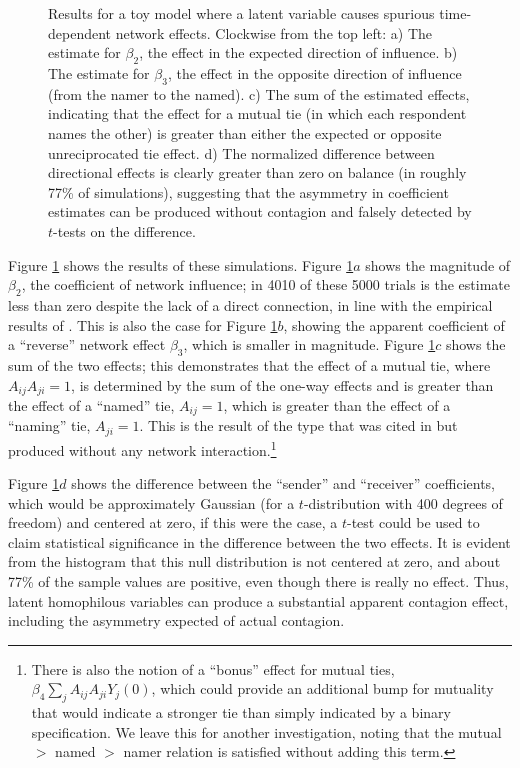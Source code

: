 \documentclass{article}
\begin{document}
\begin{multicols}{2}
\begin{figure}
\begin{center}
\end{center}
\caption{Results for a toy model where a latent variable causes spurious
  time-dependent network effects. Clockwise from the top left: a) The estimate
  for $\beta_2$, the effect in the expected direction of influence. b) The
  estimate for $\beta_3$, the effect in the opposite direction of influence
  (from the namer to the named). c) The sum of the estimated effects,
  indicating that the effect for a mutual tie (in which each respondent names
  the other) is greater than either the expected or opposite unreciprocated tie
  effect. d) The normalized difference between directional effects is clearly
  greater than zero on balance (in roughly 77\% of simulations), suggesting
  that the asymmetry in coefficient estimates can be produced without contagion
  and falsely detected by $t$-tests on the
  difference. \label{fig:timeseriesmodel}}
\end{figure}


Figure \ref{fig:timeseriesmodel} shows the results of these simulations.
Figure \ref{fig:timeseriesmodel}$a$ shows the magnitude of $\beta_2$, the
coefficient of network influence; in 4010 of these 5000 trials is the estimate
less than zero despite the lack of a direct connection, in line with the
empirical results of \citet{Cohen-Cole-Fletcher}. This is also the case for
Figure \ref{fig:timeseriesmodel}$b$, showing the apparent coefficient of a
``reverse'' network effect $\beta_3$, which is smaller in magnitude. Figure
\ref{fig:timeseriesmodel}$c$ shows the sum of the two effects; this
demonstrates that the effect of a mutual tie, where $A_{ij}A_{ji}=1$, is
determined by the sum of the one-way effects and is greater than the effect of
a ``named'' tie, $A_{ij}=1$, which is greater than the effect of a ``naming''
tie, $A_{ji}=1$. This is the result of the type that was cited in
\citet{Christakis-Fowler-spread-of-obesity, Fowler-Christakis-happiness} but
produced without any network interaction.\footnote{There is also the notion of
  a ``bonus'' effect for mutual ties, $\beta_4 \sum_j A_{ij}A_{ji}Y_j(0)$,
  which could provide an additional bump for mutuality that would indicate a
  stronger tie than simply indicated by a binary specification. We leave this
  for another investigation, noting that the mutual $>$ named $>$ namer
  relation is satisfied without adding this term.}

Figure \ref{fig:timeseriesmodel}$d$ shows the difference between the ``sender''
and ``receiver'' coefficients, which would be approximately Gaussian (for a
$t$-distribution with 400 degrees of freedom) and centered at zero, if this
were the case, a $t$-test could be used to claim statistical significance in
the difference between the two effects.  It is evident from the histogram that
this null distribution is not centered at zero, and about 77\% of the sample
values are positive, even though there is really no effect.  Thus, latent
homophilous variables can produce a substantial apparent contagion effect,
including the asymmetry expected of actual contagion.


\end{multicols}
\end{document}
